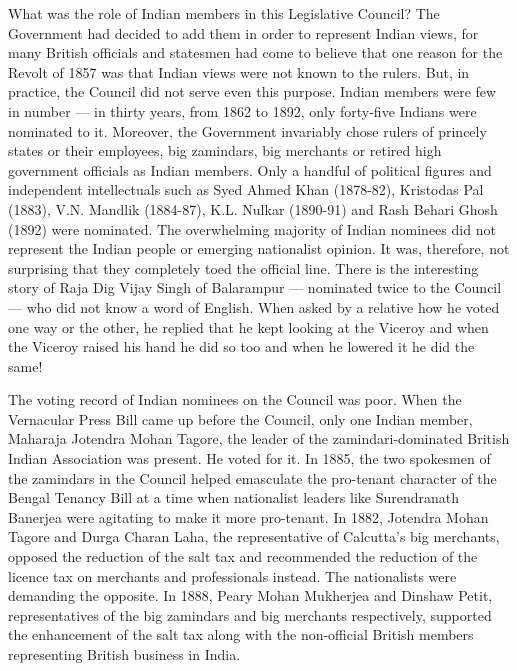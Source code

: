 What was the role of Indian members in this Legislative Council? The Government had decided to add them in order to represent Indian views, for many British officials and statesmen had come to believe that one reason for the Revolt of 1857 was that Indian views were not known to the rulers. But, in practice, the Council did not serve even this purpose. Indian members were few in number — in thirty years, from 1862 to 1892, only forty-five Indians were nominated to it. Moreover, the Government invariably chose rulers of princely states or their employees, big zamindars, big merchants or retired high government officials as Indian members. Only a handful of political figures and independent intellectuals such as Syed Ahmed Khan (1878-82), Kristodas Pal (1883), V.N. Mandlik (1884-87), K.L. Nulkar (1890-91) and Rash Behari Ghosh (1892) were nominated. The overwhelming majority of Indian nominees did not represent the Indian people or emerging nationalist opinion. It was, therefore, not surprising that they completely toed the official line. There is the interesting story of Raja Dig Vijay Singh of Balarampur — nominated twice to the Council — who did not know a word of English. When asked by a relative how he voted one way or the other, he replied that he kept looking at the Viceroy and when the Viceroy raised his hand he did so too and when he lowered it he did the same!

The voting record of Indian nominees on the Council was poor. When the Vernacular Press Bill came up before the Council, only one Indian member, Maharaja Jotendra Mohan Tagore, the leader of the zamindari-dominated British Indian Association was present. He voted for it. In 1885, the two spokesmen of the zamindars in the Council helped emasculate the pro-tenant character of the Bengal Tenancy Bill at a time when nationalist leaders like Surendranath Banerjea were agitating to make it more pro-tenant. In 1882, Jotendra Mohan Tagore and Durga Charan Laha, the representative of Calcutta's big merchants, opposed the reduction of the salt tax and recommended the reduction of the licence tax on merchants and professionals instead. The nationalists were demanding the opposite. In 1888, Peary Mohan Mukherjea and Dinshaw Petit, representatives of the big zamindars and big merchants respectively, supported the enhancement of the salt tax along with the non-official British members representing British business in India.

